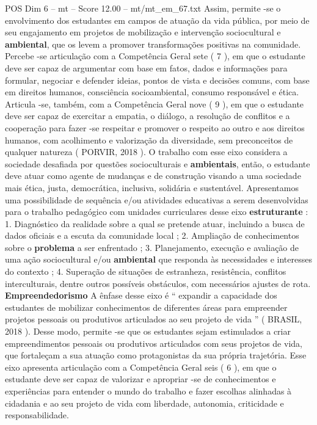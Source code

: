 \begin{textsample}{POS Dim 6 – mt – Score 12.00 – mt/mt\_em\_67.txt}
Assim, permite -se o envolvimento dos estudantes em campos de atuação da vida pública, por meio de seu engajamento em projetos de mobilização e intervenção sociocultural e \textbf{ambiental}, que os levem a promover transformações positivas na comunidade.
Percebe -se articulação com a Competência Geral sete ( 7 ), em que o estudante deve ser capaz de argumentar com base em fatos, dados e informações para formular, negociar e defender ideias, pontos de vista e decisões comuns, com base em direitos humanos, consciência socioambiental, consumo responsável e ética.
Articula -se, também, com a Competência Geral nove ( 9 ), em que o estudante deve ser capaz de exercitar a empatia, o diálogo, a resolução de conflitos e a cooperação para fazer -se respeitar e promover o respeito ao outro e aos direitos humanos, com acolhimento e valorização da diversidade, sem preconceitos de qualquer natureza ( PORVIR, 2018 ).
O trabalho com esse eixo considera a sociedade desafiada por questões socioculturais e \textbf{ambientais}, então, o estudante deve atuar como agente de mudanças e de construção visando a uma sociedade mais ética, justa, democrática, inclusiva, solidária e sustentável.
Apresentamos uma possibilidade de sequência e/ou atividades educativas a serem desenvolvidas para o trabalho pedagógico com unidades curriculares desse eixo \textbf{estruturante} : 1.
Diagnóstico da realidade sobre a qual se pretende atuar, incluindo a busca de dados oficiais e a escuta da comunidade local ; 2.
Ampliação de conhecimentos sobre o \textbf{problema} a ser enfrentado ; 3.
Planejamento, execução e avaliação de uma ação sociocultural e/ou \textbf{ambiental} que responda às necessidades e interesses do contexto ; 4.
Superação de situações de estranheza, resistência, conflitos interculturais, dentre outros possíveis obstáculos, com necessários ajustes de rota. \textbf{Empreendedorismo} A ênfase desse eixo é “ expandir a capacidade dos estudantes de mobilizar conhecimentos de diferentes áreas para empreender projetos pessoais ou produtivos articulados ao seu projeto de vida ” ( BRASIL, 2018 ).
Desse modo, permite -se que os estudantes sejam estimulados a criar empreendimentos pessoais ou produtivos articulados com seus projetos de vida, que fortaleçam a sua atuação como protagonistas da sua própria trajetória.
Esse eixo apresenta articulação com a Competência Geral seis ( 6 ), em que o estudante deve ser capaz de valorizar e apropriar -se de conhecimentos e experiências para entender o mundo do trabalho e fazer escolhas alinhadas à cidadania e ao seu projeto de vida com liberdade, autonomia, criticidade e responsabilidade.

\end{textsample}
